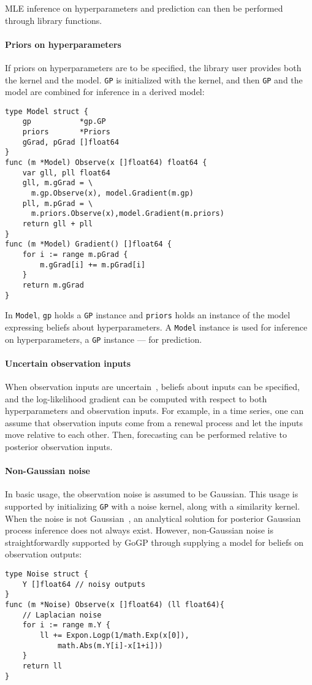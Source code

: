 \documentclass[sigplan,review]{acmart}\settopmatter{printfolios=true,printccs=false,printacmref=false}
\begin{document}
MLE inference on hyperparameters and prediction can then be performed
through library functions.

\paragraph{Priors on hyperparameters}

If priors on hyperparameters are to be specified, the library
user provides both the kernel and the model.  \lstinline{GP} is
initialized with the kernel, and then \lstinline{GP} and the
model are combined for inference in a derived model:
\begin{lstlisting}
type Model struct {
    gp           *gp.GP
    priors       *Priors
    gGrad, pGrad []float64
}
func (m *Model) Observe(x []float64) float64 {
    var gll, pll float64
    gll, m.gGrad = \
      m.gp.Observe(x), model.Gradient(m.gp)
    pll, m.pGrad = \
      m.priors.Observe(x),model.Gradient(m.priors)
    return gll + pll
}
func (m *Model) Gradient() []float64 {
	for i := range m.pGrad {
		m.gGrad[i] += m.pGrad[i]
	}
	return m.gGrad
}
\end{lstlisting}
In \lstinline{Model}, \lstinline{gp} holds a \lstinline{GP}
instance and \lstinline{priors} holds an instance of the model
expressing beliefs about hyperparameters. A \lstinline{Model}
instance is used for inference on hyperparameters, a
\lstinline{GP} instance --- for prediction.

\paragraph{Uncertain observation inputs}

When observation inputs are uncertain~\cite{MR11}, beliefs about inputs can
be specified, and the log-likelihood gradient can be computed
with respect to both hyperparameters and observation inputs. For
example, in a time series, one can assume that observation
inputs come from a renewal process and let the inputs move 
relative to each other. Then, forecasting can be performed 
relative to posterior observation inputs.

\paragraph{Non-Gaussian noise}

In basic usage, the observation noise is assumed to be Gaussian.
This usage is supported by initializing \lstinline{GP} with a noise
kernel, along with a similarity kernel. When the noise is not
Gaussian~\cite{MWN+17}, an analytical solution for posterior Gaussian process
inference does not always exist. However, non-Gaussian noise is
straightforwardly supported by GoGP through supplying a
model for beliefs on observation outputs:
\begin{lstlisting}
type Noise struct {
	Y []float64 // noisy outputs
}
func (m *Noise) Observe(x []float64) (ll float64){
	// Laplacian noise
	for i := range m.Y {
		ll += Expon.Logp(1/math.Exp(x[0]),
			math.Abs(m.Y[i]-x[1+i]))
	}
	return ll
}
\end{lstlisting}



\end{document}
